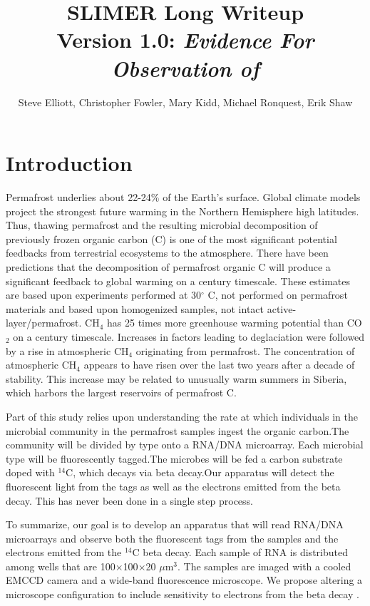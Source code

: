 \documentclass[11pt]{article}
\title{SLIMER Long Writeup\\
Version 1.0: \emph{Evidence For Observation of \nuc{14}{C}}
}
\author{Steve Elliott,
Christopher Fowler,
Mary Kidd,
Michael Ronquest,
Erik Shaw
}
\begin{document}
\maketitle
\section{Introduction}
Permafrost underlies about 22-24\% of the Earth's surface.  Global climate models project the strongest future warming in the Northern Hemisphere high latitudes.  Thus, thawing permafrost and the resulting microbial decomposition of previously frozen organic carbon (C) is one of the most significant potential feedbacks from terrestrial ecosystems to the atmosphere.   There have been predictions that the decomposition of permafrost organic C will produce a significant feedback to global warming on a century timescale.  These estimates are based upon experiments performed at 30$^\circ$ C, not performed on permafrost materials and based upon homogenized samples, not intact active-layer/permafrost.  CH$_4$ has 25 times more greenhouse warming potential than CO$_2$ on a century timescale.  Increases in factors leading to deglaciation were followed by a rise in atmospheric CH$_4$ originating from  permafrost.  The concentration of atmospheric CH$_4$ appears to have risen over the last two years after a decade of stability. This increase may be related to unusually warm summers in Siberia, which harbors the largest reservoirs of permafrost C. 

Part of this study relies upon understanding the rate at which individuals in the microbial community in the permafrost samples ingest the organic carbon.The community will be divided by type onto a RNA/DNA microarray.  Each microbial type will be fluorescently tagged.The microbes will be fed a carbon substrate doped with $^{14}$C, which decays via beta decay.Our apparatus will detect the fluorescent light from the tags as well as the electrons emitted from the beta decay.  This has never been done in a single step process.

To summarize, our goal is to develop an apparatus that will read RNA/DNA microarrays and observe both the fluorescent tags from the samples and the electrons emitted from the $^{14}$C beta decay.  Each sample of RNA is distributed among wells that are 100$\times$100$\times$20 $\mu$m$^3$.  The samples are imaged with a cooled EMCCD camera and a wide-band fluorescence microscope.  We propose altering a microscope configuration to include sensitivity to electrons from the beta decay .  
\end{document}
